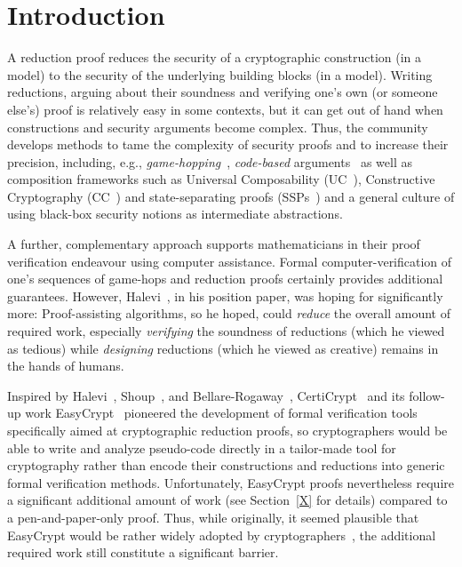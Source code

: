 \section{Introduction}
A reduction proof reduces the security of a cryptographic construction (in a model) to the security of the underlying building blocks (in a model). Writing reductions, arguing about their soundness and verifying one's own (or someone else's) proof is relatively easy in some contexts, but it can get out of hand when constructions and security arguments become complex. Thus, the community develops methods to tame the complexity of security proofs and to increase their precision, including, e.g., \emph{game-hopping}~\cite{EPRINT:Shoup04}, \emph{code-based} arguments~\cite{EC:BelRog06} as well as composition frameworks such as Universal Composability (UC~\cite{FOCS:Canetti01}), Constructive Cryptography (CC~\cite{FC:Maurer10}) and state-separating proofs (SSPs~\cite{X}) and a general culture of using black-box security notions as intermediate abstractions.

A further, complementary approach supports mathematicians in their proof verification endeavour
using computer assistance. Formal computer-verification of one's sequences of game-hops and reduction proofs certainly provides additional guarantees. However, Halevi~\cite{X}, in his position paper, was hoping for significantly more: Proof-assisting algorithms, so he hoped, could \emph{reduce} the overall amount of required work, especially \emph{verifying} the soundness of reductions (which he viewed as tedious) while \emph{designing} reductions (which he viewed as creative) remains in the hands of humans.


Inspired by Halevi~\cite{X}, Shoup~\cite{EPRINT:Shoup04}, and Bellare-Rogaway~\cite{EC:BelRog06},
CertiCrypt~\cite{X} and its follow-up work EasyCrypt~\cite{X} pioneered the development of formal
verification tools specifically aimed at cryptographic reduction proofs, so cryptographers would
 be able to write and analyze pseudo-code directly in a tailor-made tool for cryptography rather 
than encode their constructions and reductions into generic formal verification methods. 
Unfortunately, EasyCrypt proofs nevertheless
require a significant additional amount of work (see Section~\ref{X} for details) compared to a pen-and-paper-only proof. Thus, while originally, it seemed plausible that EasyCrypt would be rather widely adopted by cryptographers~\cite[page 1]{X}, the additional required work still constitute a significant barrier.

